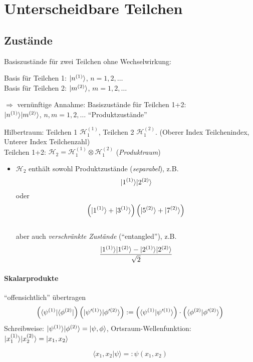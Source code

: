 \documentclass[11pt,a4paper]{report}
\begin{document}
\section{Unterscheidbare Teilchen}

\subsection{Zustände}

\newcommand{\bra}[1]{\langle #1 |}
\newcommand{\sprod}[2]{\langle #1 | #2 \rangle}

Basiszustände für zwei Teilchen ohne Wechselwirkung:\par 
Basis für Teilchen 1: $|n^{(1)}\rangle$, $n=1,2,\ldots$\\
Basis für Teilchen 2: $|m^{(2)}\rangle$, $m=1,2,\ldots$\par 
$\Rightarrow$ vernünftige Annahme: Basiszustände für Teilchen 1+2:\\ $|n^{(1)}\rangle|m^{(2)}\rangle$, $n,m=1,2,\ldots$ ``Produktzustände''\par 

Hilbertraum: Teilchen 1 $\mathcal{H}_1^{(1)}$, Teilchen 2 $\mathcal{H}_1^{(2)}$. (Oberer Index Teilchenindex, Unterer Index Teilchenzahl)\\
Teilchen 1+2: $\mathcal{H}_2=\mathcal{H}_1^{(1)}\otimes\mathcal{H}_1^{(2)}$ (\textit{Produktraum})
\begin{itemize}
\item $\mathcal{H}_2$ enthält sowohl Produktzustände (\textit{separabel}), z.B. $$|1^{(1)}\rangle|2^{(2)}\rangle$$ oder $$\left(|1^{(1)}\rangle+|{3}^{(1)}\rangle\right)\left(|5^{(2)}\rangle+|7^{(2)}\rangle\right)$$\\
aber auch \textit{verschränkte Zustände} (``entangled''), z.B. $$\frac{|1^{(1)}\rangle|1^{(2)}\rangle-|2^{(1)}\rangle|2^{(2)}\rangle}{\sqrt{2}}$$
\end{itemize}

\paragraph{Skalarprodukte} ``offensichtlich'' übertragen
$$\left(\bra{\psi^{(1)}}\bra{\phi^{(2)}}\right)\left(\ket{\psi'^{(1)}}\ket{\phi'^{(2)}}\right):=\left(\sprod{\psi^{(1)}}{\psi'^{(1)}}\right)\cdot \left(\sprod{\phi^{(2)}}{\phi'^{(2)}}\right)$$
Schreibweise: $|\psi^{(1)}\rangle|\phi^{(2)}\rangle=|\psi ,\phi\rangle$, 
Ortsraum-Wellenfunktion: $|x_1^{(1)}\rangle|x_2^{(2)}\rangle=|x_1,x_2\rangle$\par 
$$\sprod{x_1,x_2}{\psi}=:\psi (x_1,x_2)$$
\end{document}
